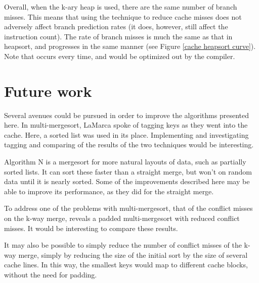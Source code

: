 Overall, when the k-ary heap is used, there are the same number of branch
misses. This means that using the technique to reduce cache misses does not
adversely affect branch prediction rates (it does, however, still affect the
instruction count).  The rate of branch misses is much the same as that in
heapsort, and progresses in the same manner (see Figure \ref{cache heapsort
curve}). Note that  occurs every time, and would be optimized
out by the compiler.


\section{Future work}
Several avenues could be pursued in order to improve the algorithms presented
here. In multi-mergesort, LaMarca spoke of tagging keys as they went into the
cache. Here, a sorted list was used in its place. Implementing and investigating
tagging and comparing of the results of the two techniques would be interesting.

Algorithm N is a mergesort for more natural layouts of data, such as partially
sorted lists. It can sort these faster than a straight merge, but won't on
random data until it is nearly sorted. Some of the improvements described here
may be able to improve its performance, as they did for the straight merge.

To address one of the problems with multi-mergesort, that of the conflict misses
on the k-way merge, \cite{Xiao00} reveals a padded multi-mergesort with reduced 
conflict misses. It would be interesting to compare these results.

It may also be possible to simply reduce the number of conflict misses of the
k-way merge, simply by reducing the size of the initial sort by the size of
several cache lines. In this way, the smallest keys would map to different
cache blocks, without the need for padding.

